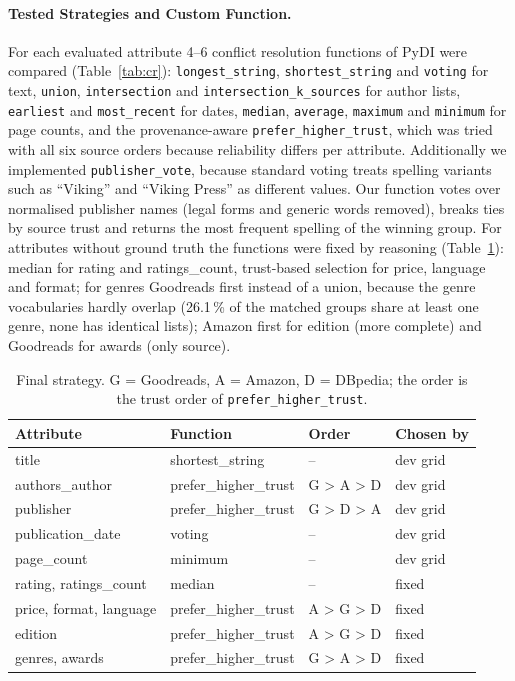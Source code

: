 \documentclass[a4paper,11pt]{article}
\begin{document}
\paragraph{Tested Strategies and Custom Function.}
For each evaluated attribute 4--6 conflict resolution functions of PyDI were
compared (Table~\ref{tab:cr}): \texttt{longest\_string}, \texttt{shortest\_string}
and \texttt{voting} for text, \texttt{union}, \texttt{intersection} and
\texttt{intersection\_k\_sources} for author lists, \texttt{earliest} and
\texttt{most\_recent} for dates, \texttt{median}, \texttt{average},
\texttt{maximum} and \texttt{minimum} for page counts, and the provenance-aware
\texttt{prefer\_higher\_trust}, which was tried with all six source orders because
reliability differs per attribute. Additionally we implemented
\texttt{publisher\_vote}, because standard voting treats spelling variants such as
``Viking'' and ``Viking Press'' as different values. Our function votes over
normalised publisher names (legal forms and generic words removed), breaks ties
by source trust and returns the most frequent spelling of the winning group.
For attributes without ground truth the functions were fixed by reasoning
(Table~\ref{tab:strategy}): median for rating and ratings\_count, trust-based
selection for price, language and format; for genres Goodreads first instead of a
union, because the genre vocabularies hardly overlap (26.1\,\% of the matched
groups share at least one genre, none has identical lists); Amazon first for
edition (more complete) and Goodreads for awards (only source).


\begin{table}[t]
\centering
\caption{Final strategy. G = Goodreads, A = Amazon, D = DBpedia; the order
is the trust order of \texttt{prefer\_higher\_trust}.}
\label{tab:strategy}
\small
\begin{tabular}{llll}
\toprule
Attribute & Function & Order & Chosen by \\
\midrule
title             & shortest\_string     & --        & dev grid \\
authors\_author   & prefer\_higher\_trust& G > A > D & dev grid \\
publisher         & prefer\_higher\_trust& G > D > A & dev grid \\
publication\_date & voting               & --        & dev grid \\
page\_count       & minimum              & --        & dev grid \\
rating, ratings\_count & median          & --        & fixed \\
price, format, language & prefer\_higher\_trust & A > G > D & fixed \\
edition           & prefer\_higher\_trust& A > G > D & fixed \\
genres, awards    & prefer\_higher\_trust& G > A > D & fixed \\
\bottomrule
\end{tabular}
\end{table}
\end{document}

